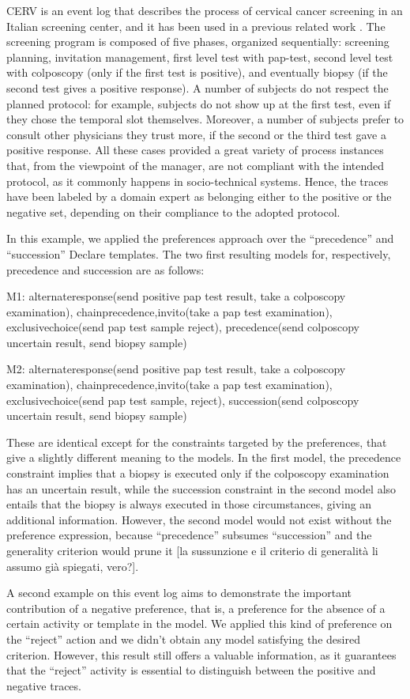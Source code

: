 CERV is an event log that describes the process of cervical cancer screening in an Italian screening center, and it has been used in a previous related work \cite{??,deviant-tkde}. The screening program is composed of five phases, organized sequentially: screening planning, invitation management, first level test with pap-test, second level test with colposcopy (only if the first test is positive), and eventually biopsy (if the second test gives a positive response). A number of subjects do not respect the planned protocol: for example, subjects do not show up at the first test, even if they chose the temporal slot themselves. Moreover, a number of subjects prefer to consult other physicians they trust more, if the second or the third test gave a positive response. All these cases provided a great variety of process instances that, from the viewpoint of the manager, are not compliant with the intended protocol, as it commonly happens in socio-technical systems.
%
Hence, the traces have been labeled by a domain expert as belonging either to the positive or the negative set, depending on their compliance to the adopted protocol.


In this example, we applied the preferences approach over the “precedence” and “succession” Declare templates. The two first resulting models for, respectively, precedence and succession are as follows:

M1: {    alternateresponse(send positive pap test result, take a colposcopy examination), 
chainprecedence,invito(take a pap test examination), 
exclusivechoice(send pap test sample reject),
precedence(send colposcopy uncertain result, send biopsy sample) }

M2: {     alternateresponse(send positive pap test result, take a colposcopy examination),
chainprecedence,invito(take a pap test examination),
exclusivechoice(send pap test sample, reject),
succession(send colposcopy uncertain result, send biopsy sample) }

These are identical except for the constraints targeted by the preferences, that give a slightly different meaning to the models. In the first model, the precedence constraint implies that a biopsy is executed only if the colposcopy examination has an uncertain result, while the succession constraint in the second model also entails that the biopsy is always executed in those circumstances, giving an additional information.
However, the second model would not exist without the preference expression, because “precedence” subsumes “succession” and the generality criterion would prune it [la sussunzione e il criterio di generalità li assumo già spiegati, vero?].  

A second example on this event log aims to demonstrate the important contribution of a negative preference, that is, a preference for the absence of a certain activity or template in the model. We applied this kind of preference on the “reject” action and we didn’t obtain any model satisfying the desired criterion. However, this result still offers a valuable information, as it guarantees that the “reject” activity is essential to distinguish between the positive and negative traces.

